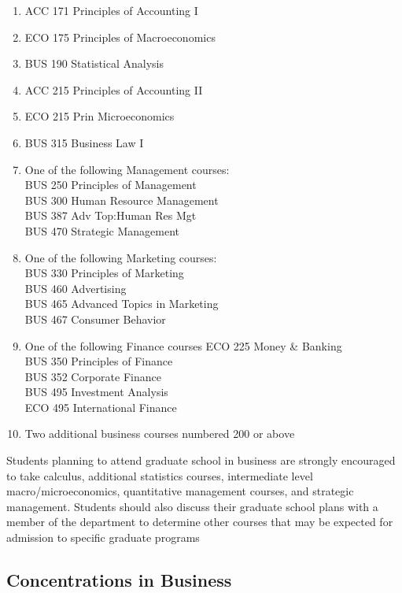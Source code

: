 \documentclass[
  letterpaper,
]{scrbook}
\providecommand{\tightlist}{%
  \setlength{\itemsep}{0pt}\setlength{\parskip}{0pt}}
\begin{document}
\begin{enumerate}
\def\labelenumi{\arabic{enumi}.}
\tightlist
\item
  ACC 171 Principles of Accounting I
\item
  ECO 175 Principles of Macroeconomics
\item
  BUS 190 Statistical Analysis
\item
  ACC 215 Principles of Accounting II
\item
  ECO 215 Prin Microeconomics
\item
  BUS 315 Business Law I
\item
  One of the following Management courses:\\
  BUS 250 Principles of Management\\
  BUS 300 Human Resource Management\\
  BUS 387 Adv Top:Human Res Mgt\\
  BUS 470 Strategic Management\\
\item
  One of the following Marketing courses:\\
  BUS 330 Principles of Marketing\\
  BUS 460 Advertising\\
  BUS 465 Advanced Topics in Marketing\\
  BUS 467 Consumer Behavior\\
\item
  One of the following Finance courses ECO 225 Money \& Banking\\
  BUS 350 Principles of Finance\\
  BUS 352 Corporate Finance\\
  BUS 495 Investment Analysis\\
  ECO 495 International Finance\\
\item
  Two additional business courses numbered 200 or above
\end{enumerate}

Students planning to attend graduate school in business are strongly
encouraged to take calculus, additional statistics courses, intermediate
level macro/microeconomics, quantitative management courses, and
strategic management. Students should also discuss their graduate school
plans with a member of the department to determine other courses that
may be expected for admission to specific graduate programs

\subsection{Concentrations in
Business}\label{concentrations-in-business}
\end{document}

